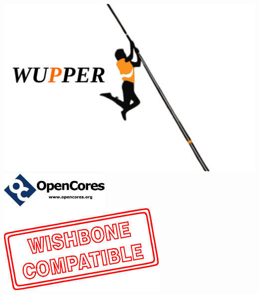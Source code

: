 \begin{titlepage}
	\maketitle
	\thispagestyle{titlepage}
	\begin{center}
	\vspace{2cm}
	\includegraphics[width=1\textwidth]{figures/random_wupper_orange.pdf} \\
	\vspace{4cm}
	\includegraphics[width=0.4\textwidth]{figures/oclogo.jpg} 	
	\hspace{2cm}
    \includegraphics[scale=1]{figures/wb_compatible.pdf}		
	\end{center}

\end{titlepage}
\newpage